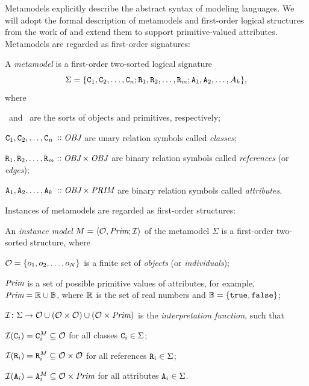 Metamodels explicitly describe the abstract syntax of modeling languages. We will adopt the formal description of metamodels and first-order logical structures from the work of \citet{Varro17generation} and extend them to support primitive-valued attributes. Metamodels are regarded as first-order signatures:

\begin{dfn}
  A \emph{metamodel} is a first-order two-sorted logical signature
  \begin{equation}
    \Sigma = \{\texttt{\upshape C}_1, \texttt{\upshape C}_2, \ldots, \texttt{\upshape C}_n; \texttt{\upshape R}_1, \texttt{\upshape R}_2, \ldots, \texttt{\upshape R}_m; \texttt{\upshape A}_1, \texttt{\upshape A}_2, \ldots, A_k\} \text,
  \end{equation}
  where
  \begin{compactitem}
  \item \OBJsort\ and \PRIMsort\ are the sorts of objects and primitives, respectively;
  \item \(\lit C_1, \lit C_2, \ldots, \lit C_{\mathrlap{n}\phantom{m}} \ofkind \OBJsort\) are unary relation symbols called \emph{classes};
  \item \(\texttt{\upshape R}_1, \texttt{\upshape R}_2, \ldots, \texttt{\upshape R}_m \mathrel{\vcentcolon\vcentcolon} \textit{OBJ} \times \textit{OBJ}\) are binary relation symbols called \emph{references} (or \emph{edges});
  \item \(\lit A_1, \lit A_2, \ldots, \lit A_{\mathrlap{k}\phantom{m}} \ofkind \OBJsort \times \PRIMsort\) are binary relation symbols called \emph{attributes}.
  \end{compactitem}
\end{dfn}

Instances of metamodels are regarded as first-order structures:

\begin{dfn}
  An \emph{instance model} \(M = \langle \mathcal{O}, \textit{Prim}; \mathcal{I} \rangle\) of the metamodel \(\Sigma\) is a first-order two-sorted structure, where
  \begin{compactitem}
  \item \(\mathcal{O} = \{o_1, o_2, \ldots, o_N\}\) is a finite set of \emph{objects} (or \emph{individuals});
  \item \(\textit{Prim}\) is a set of possible primitive values of attributes, for example, \(\textit{Prim} = \mathbb{R} \cup \mathbb{B}\), where \(\mathbb{R}\) is the set of real numbers and \(\mathbb{B} = \{\texttt{\upshape true}, \texttt{\upshape false}\}\);
  \item \(\mathcal{I}\colon \Sigma \to \mathcal{O} \cup (\mathcal{O} \times \mathcal{O}) \cup (\mathcal{O} \times \textit{Prim})\) is the \emph{interpretation function}, such that
    \begin{compactitem}
    \item \(\mathcal{I}(\texttt{\upshape C}_i) = \texttt{\upshape C}_i^M \subseteq \mathcal{O}\) for all classes \(\texttt{\upshape C}_i \in \Sigma\);
    \item \(\mathcal{I}(\texttt{\upshape R}_i) = \texttt{\upshape R}_i^M \subseteq \mathcal{O} \times \mathcal{O}\) for all references \(\texttt{\upshape R}_i \in \Sigma\);
    \item \(\mathcal{I}(\texttt{\upshape A}_i) = \texttt{\upshape A}_i^M \subseteq \mathcal{O} \times \textit{Prim}\) for all attributes \(\texttt{\upshape A}_i \in \Sigma\).
    \end{compactitem}
  \end{compactitem}
\end{dfn}

